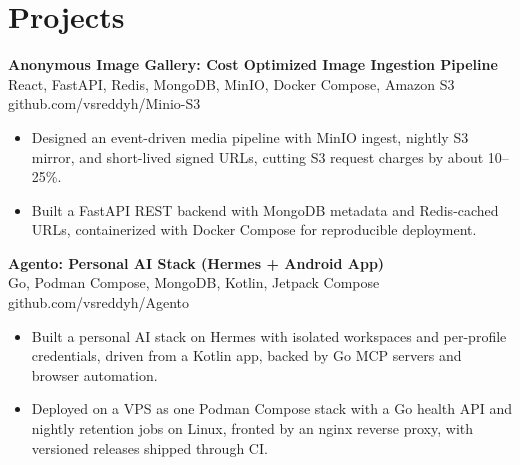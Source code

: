 \documentclass[a4paper,11pt]{article}
\newcommand{\resumeItem}[1]{\item \small{#1}}
\newcommand{\resumeSubheading}[4]{%
  \textbf{#1} \hfill \textbf{#2} \\
{#3} \hfill {#4}
}
\newcommand{\resumeSubHeadingListStart}{\begin{itemize}}
\newcommand{\resumeSubHeadingListEnd}{\end{itemize}}
\begin{document}
\section*{Projects}

\resumeSubheading
{Anonymous Image Gallery: Cost Optimized Image Ingestion Pipeline}{}{React, FastAPI, Redis, MongoDB, MinIO, Docker Compose, Amazon S3}{github.com/vsreddyh/Minio-S3}
\resumeSubHeadingListStart
\resumeItem{Designed an event-driven media pipeline with MinIO ingest, nightly S3 mirror, and short-lived signed URLs, cutting S3 request charges by about 10--25\%.}
\resumeItem{Built a FastAPI REST backend with MongoDB metadata and Redis-cached URLs, containerized with Docker Compose for reproducible deployment.}
\resumeSubHeadingListEnd

\resumeSubheading
{Agento: Personal AI Stack (Hermes + Android App)}{}{Go, Podman Compose, MongoDB, Kotlin, Jetpack Compose}{github.com/vsreddyh/Agento}
\resumeSubHeadingListStart
\resumeItem{Built a personal AI stack on Hermes with isolated workspaces and per-profile credentials, driven from a Kotlin app, backed by Go MCP servers and browser automation.}
\resumeItem{Deployed on a VPS as one Podman Compose stack with a Go health API and nightly retention jobs on Linux, fronted by an nginx reverse proxy, with versioned releases shipped through CI.}
\resumeSubHeadingListEnd


\vspace{-0.6em}
\end{document}
